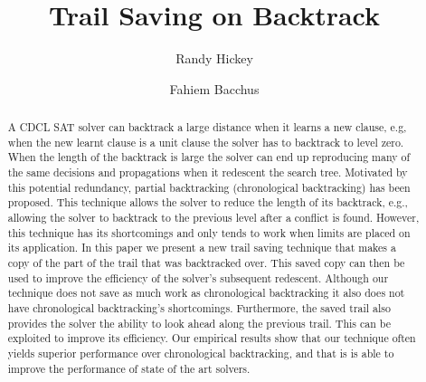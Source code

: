 \documentclass[runningheads]{llncs}
\title{Trail Saving on Backtrack}
\author{Randy Hickey \and Fahiem Bacchus}
\institute{Department of Computer Science, University of Toronto, Canada, 
  \email{rgh000@gmail.com, fbacchus@cs.toronto.edu}}
\newcommand{\sat}{SAT\xspace}
\begin{document}
\maketitle
\begin{abstract}
    A CDCL \sat solver can backtrack a large distance when it learns a
    new clause, e.g, when the new learnt clause is a unit clause the
    solver has to backtrack to level zero. When the length of the
    backtrack is large the solver can end up reproducing many of the
    same decisions and propagations when it redescent the search
    tree. Motivated by this potential redundancy, partial backtracking
    (chronological backtracking) has been proposed. This technique
    allows the solver to reduce the length of its backtrack, e.g.,
    allowing the solver to backtrack to the previous level after a
    conflict is found. However, this technique has its shortcomings
    and only tends to work when limits are placed on its
    application. In this paper we present a new trail saving technique
    that makes a copy of the part of the trail that was backtracked
    over. This saved copy can then be used to improve the efficiency
    of the solver's subsequent redescent. Although our technique does
    not save as much work as chronological backtracking it also does
    not have chronological backtracking's shortcomings. Furthermore,
    the saved trail also provides the solver the ability to look ahead
    along the previous trail. This can be exploited to improve its
    efficiency. Our empirical results show that our technique often
    yields superior performance over chronological backtracking, and
    that is is able to improve the performance of state of the art
    solvers.

\end{abstract}
\end{document}
